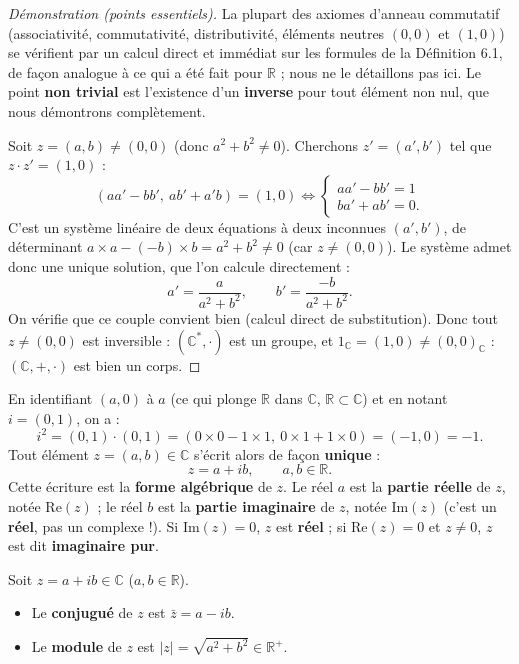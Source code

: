 \documentclass[a4paper,12pt,openany]{book}
\begin{document}
\begin{proof}[Démonstration (points essentiels)]
La plupart des axiomes d'anneau commutatif (associativité, commutativité,
distributivité, éléments neutres $(0,0)$ et $(1,0)$) se vérifient par un
calcul direct et immédiat sur les formules de la Définition 6.1, de façon
analogue à ce qui a été fait pour $\mathbb{R}$ ; nous ne le détaillons pas
ici. Le point \textbf{non trivial} est l'existence d'un \textbf{inverse}
pour tout élément non nul, que nous démontrons complètement.

Soit $z=(a,b) \neq (0,0)$ (donc $a^2+b^2\neq0$). Cherchons
$z'=(a',b')$ tel que $z\cdot z' = (1,0)$ :
\[
(aa'-bb',\ ab'+a'b) = (1,0) \iff
\begin{cases} aa'-bb' = 1 \\ ba'+ab' = 0. \end{cases}
\]
C'est un système linéaire de deux équations à deux inconnues $(a',b')$,
de déterminant $a\times a - (-b)\times b = a^2+b^2 \neq 0$ (car
$z\neq(0,0)$). Le système admet donc une unique solution, que l'on
calcule directement :
\[
a' = \frac{a}{a^2+b^2}, \qquad b' = \frac{-b}{a^2+b^2}.
\]
On vérifie que ce couple convient bien (calcul direct de substitution).
Donc tout $z\neq(0,0)$ est inversible : $(\mathbb{C}^*,\cdot)$ est un
groupe, et $1_\mathbb{C}=(1,0)\neq(0,0)_\mathbb{C}$ : $(\mathbb{C},+,\cdot)$
est bien un corps.
\end{proof}

\begin{definition}
En identifiant $(a,0)$ à $a$ (ce qui plonge $\mathbb{R}$ dans
$\mathbb{C}$, $\mathbb{R}\subset\mathbb{C}$) et en notant $i=(0,1)$, on a :
\[
i^2 = (0,1)\cdot(0,1) = (0\times0-1\times1,\ 0\times1+1\times0) = (-1,0)
= -1.
\]
Tout élément $z=(a,b)\in\mathbb{C}$ s'écrit alors de façon
\textbf{unique} :
\[
z = a+ib, \qquad a,b\in\mathbb{R}.
\]
Cette écriture est la \textbf{forme algébrique} de $z$. Le réel $a$ est la
\textbf{partie réelle} de $z$, notée $\mathrm{Re}(z)$ ; le réel $b$ est la
\textbf{partie imaginaire} de $z$, notée $\mathrm{Im}(z)$ (c'est un
\textbf{réel}, pas un complexe !). Si $\mathrm{Im}(z)=0$, $z$ est
\textbf{réel} ; si $\mathrm{Re}(z)=0$ et $z\neq0$, $z$ est dit
\textbf{imaginaire pur}.
\end{definition}


\begin{definition}
Soit $z=a+ib\in\mathbb{C}$ ($a,b\in\mathbb{R}$).
\begin{itemize}
  \item Le \textbf{conjugué} de $z$ est $\bar z = a-ib$.
  \item Le \textbf{module} de $z$ est $|z| = \sqrt{a^2+b^2} \in
  \mathbb{R}^+$.
\end{itemize}
\end{definition}
\end{document}

